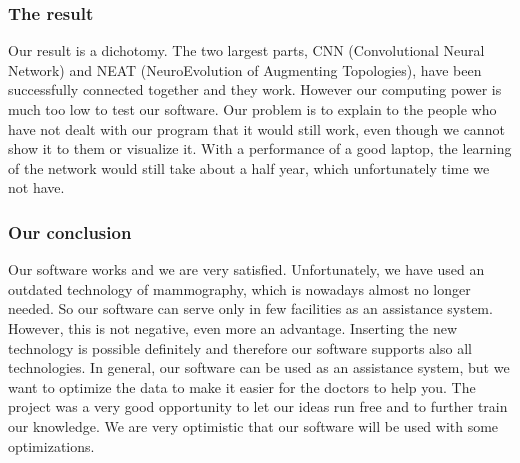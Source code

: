 \subsubsection{The result}

Our result is a dichotomy. 
The two largest parts, CNN (Convolutional Neural Network) and NEAT (NeuroEvolution of Augmenting Topologies), have been successfully connected together and they work. However our computing power is much too low to test our software. 
Our problem is to explain to the people who have not dealt with our program that it would still work, even though we cannot show it to them or visualize it. 
With a performance of a good laptop, the learning of the network would still take about a half year, which unfortunately time we not have.

\subsubsection{Our conclusion}

Our software works and we are very satisfied. Unfortunately, we have used an outdated technology of mammography, which is nowadays almost no longer needed. So our software can serve only in few facilities as an assistance system. However, this is not negative, even more an advantage. Inserting the new technology is possible definitely and therefore our software supports also all technologies.  In general, our software can be used as an assistance system, but we want to optimize the data to make it easier for the doctors to help you. 
The project was a very good opportunity to let our ideas run free and to further train our knowledge.  
We are very optimistic that our software will be used with some optimizations.
